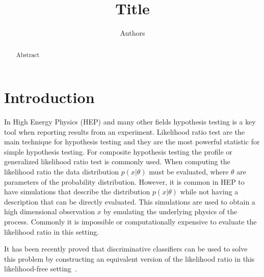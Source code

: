 \documentclass[11pt, oneside]{article}   	%
\title{Title}
\author{Authors}
\date{}							%
\begin{document}

\editor{}

\maketitle

\begin{abstract}%
Abstract
  
\end{abstract}
%


\maketitle

\section{Introduction}

In High Energy Physics (HEP) and many other fields hypothesis testing is a key tool when reporting results from an experiment. Likelihood ratio test are 
the main technique for hypothesis testing and they are the most powerful statistic for simple hypothesis testing. For composite hypothesis 
testing the profile or generalized likelihood ratio test is commonly used. When computing the likelihood ratio the data distribution $p(x|\theta)$ must 
be evaluated, where $\theta$ are parameters of the probability distribution. However, it is common in HEP to have simulations that describe the distribution $p(x|\theta)$ while not having a description that can be directly evaluated. This simulations are used to obtain a high dimensional observation $x$ by emulating the underlying physics of the process. Commonly it is impossible or computationally expensive to evaluate the likelihood ratio in this setting.

It has been recently proved that discriminative classifiers can be used to solve this problem by constructing an equivalent version of the likelihood ratio in this likelihood-free setting~\citep{Cranmer2015}.
\end{document}
